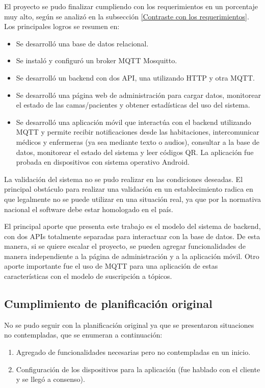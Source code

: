 El proyecto se pudo finalizar cumpliendo con los requerimientos en un porcentaje muy alto, según se analizó en la subsección \ref{Contraste con los requerimientos}. Los principales logros se resumen en:
\begin{itemize}
\item Se desarrolló una base de datos relacional.
\item Se instaló y configuró un broker MQTT Mosquitto.
\item Se desarrolló un backend con dos API, una utilizando HTTP y otra MQTT.
\item Se desarrolló una página web de administración para cargar datos, monitorear el estado de las camas/pacientes y obtener estadísticas del uso del sistema.
\item Se desarrolló una aplicación móvil que interactúa con el backend utilizando MQTT y permite recibir notificaciones desde las habitaciones, intercomunicar médicos y enfermeras (ya sea mediante texto o audios), consultar a la base de datos, monitorear el estado del sistema y leer códigos QR. La aplicación fue probada en dispositivos con sistema operativo Android.
\end{itemize}


La validación del sistema no se pudo realizar en las condiciones deseadas. El principal obstáculo para realizar una validación en un establecimiento radica en que legalmente no se puede utilizar en una situación real, ya que por la normativa nacional el software debe estar homologado en el país.  


El principal aporte que presenta este trabajo es el modelo del sistema de backend, con dos APIs totalmente separadas para interactuar con la base de datos. De esta manera, si se quiere escalar el proyecto, se pueden agregar funcionalidades de manera independiente a la página de administración y a la aplicación móvil. Otro aporte importante fue el uso de MQTT para una aplicación de estas características con el modelo de suscripción a tópicos.




\subsection{Cumplimiento de planificación original}

No se pudo seguir con la planificación original ya que se presentaron situaciones no contempladas, que se enumeran a continuación:
\begin{enumerate}
\item Agregado de funcionalidades necesarias pero no contempladas en un inicio.
\item Configuración de los dispositivos para la aplicación (fue hablado con el cliente y se llegó a consenso).
\end{enumerate}


